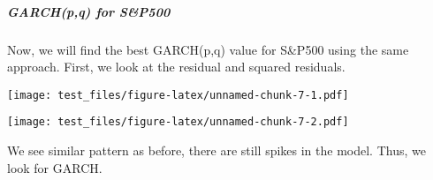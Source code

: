 \documentclass[]{article}
\newenvironment{Shaded}{\begin{snugshade}}{\end{snugshade}}
\newcommand{\KeywordTok}[1]{\textcolor[rgb]{0.13,0.29,0.53}{\textbf{#1}}}
\newcommand{\OperatorTok}[1]{\textcolor[rgb]{0.81,0.36,0.00}{\textbf{#1}}}
\newcommand{\NormalTok}[1]{#1}
\let\oldsubparagraph\subparagraph
\renewcommand{\subparagraph}[1]{\oldsubparagraph{#1}\mbox{}}
\begin{document}
\subparagraph{GARCH(p,q) for S\&P500}\label{garchpq-for-sp500}

Now, we will find the best GARCH(p,q) value for S\&P500 using the same
approach. First, we look at the residual and squared residuals.

\begin{Shaded}
\end{Shaded}

\texttt{[image: test\_files/figure-latex/unnamed-chunk-7-1.pdf]}

\begin{Shaded}
\end{Shaded}

\texttt{[image: test\_files/figure-latex/unnamed-chunk-7-2.pdf]}

We see similar pattern as before, there are still spikes in the model.
Thus, we look for GARCH.
\end{document}
